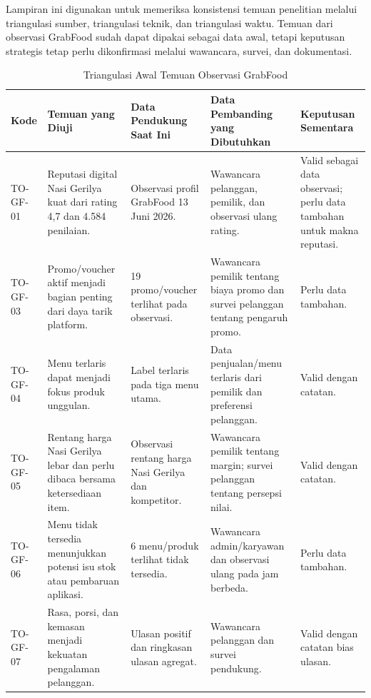 \label{app:template-triangulasi-data}

Lampiran ini digunakan untuk memeriksa konsistensi temuan penelitian melalui triangulasi sumber, triangulasi teknik, dan triangulasi waktu. Temuan dari observasi GrabFood sudah dapat dipakai sebagai data awal, tetapi keputusan strategis tetap perlu dikonfirmasi melalui wawancara, survei, dan dokumentasi.

\begin{table}[!htbp]
    \centering
    \caption{Triangulasi Awal Temuan Observasi GrabFood}
    \label{tab:triangulasi-awal-temuan-observasi-grabfood}
    \scriptsize
    \setlength{\tabcolsep}{3pt}
    \renewcommand{\arraystretch}{0.92}
    \begin{tabularx}{\textwidth}{|Z{2cm}|Y|Y|Y|Y|}
        \toprule
        \textbf{Kode} & \textbf{Temuan yang Diuji} & \textbf{Data Pendukung Saat Ini} & \textbf{Data Pembanding yang Dibutuhkan} & \textbf{Keputusan Sementara} \\ \hline
        \midrule
        TO-GF-01 & Reputasi digital Nasi Gerilya kuat dari rating 4,7 dan 4.584 penilaian. & Observasi profil GrabFood 13 Juni 2026. & Wawancara pelanggan, pemilik, dan observasi ulang rating. & Valid sebagai data observasi; perlu data tambahan untuk makna reputasi. \\ \hline
        TO-GF-03 & Promo/voucher aktif menjadi bagian penting dari daya tarik platform. & 19 promo/voucher terlihat pada observasi. & Wawancara pemilik tentang biaya promo dan survei pelanggan tentang pengaruh promo. & Perlu data tambahan. \\ \hline
        TO-GF-04 & Menu terlaris dapat menjadi fokus produk unggulan. & Label terlaris pada tiga menu utama. & Data penjualan/menu terlaris dari pemilik dan preferensi pelanggan. & Valid dengan catatan. \\ \hline
        TO-GF-05 & Rentang harga Nasi Gerilya lebar dan perlu dibaca bersama ketersediaan item. & Observasi rentang harga Nasi Gerilya dan kompetitor. & Wawancara pemilik tentang margin; survei pelanggan tentang persepsi nilai. & Valid dengan catatan. \\ \hline
        TO-GF-06 & Menu tidak tersedia menunjukkan potensi isu stok atau pembaruan aplikasi. & 6 menu/produk terlihat tidak tersedia. & Wawancara admin/karyawan dan observasi ulang pada jam berbeda. & Perlu data tambahan. \\ \hline
        TO-GF-07 & Rasa, porsi, dan kemasan menjadi kekuatan pengalaman pelanggan. & Ulasan positif dan ringkasan ulasan agregat. & Wawancara pelanggan dan survei pendukung. & Valid dengan catatan bias ulasan. \\ \hline

\end{tabularx}
\end{table}
